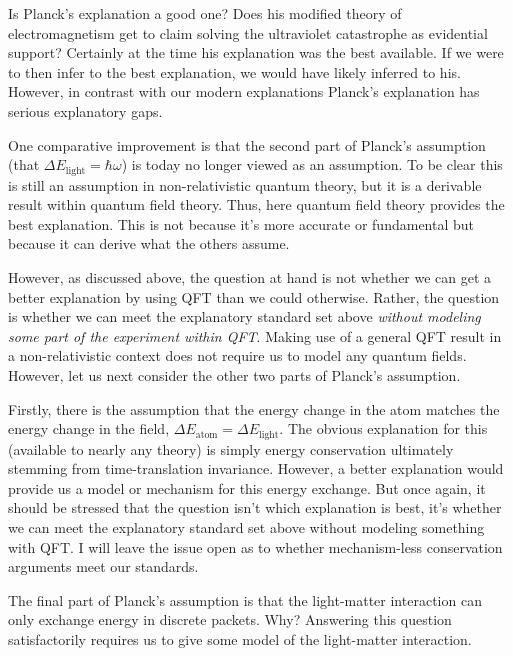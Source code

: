 \documentclass[12pt,prd,superscriptaddress,floatfix,amsmath,amssymb,amsfonts,nofootinbib]{revtex4-2}
\begin{document}
Is Planck's explanation a good one? Does his modified theory of electromagnetism get to claim solving the ultraviolet catastrophe as evidential support? Certainly at the time his explanation was the best available. If we were to then infer to the best explanation, we would have likely inferred to his. However, in contrast with our modern explanations Planck's explanation has serious explanatory gaps.

One comparative improvement is that the second part of Planck's assumption (that \mbox{$\Delta E_\text{light}=\hbar\omega$}) is today no longer viewed as an assumption. To be clear this is still an assumption in non-relativistic quantum theory, but it is a derivable result within quantum field theory. Thus, here quantum field theory provides the best explanation. This is not because it's more accurate or fundamental but because it can derive what the others assume. 

However, as discussed above, the question at hand is not whether we can get a better explanation by using QFT than we could otherwise. Rather, the question is whether we can meet the explanatory standard set above \textit{without modeling some part of the experiment within QFT}. Making use of a general QFT result in a non-relativistic context does not require us to model any quantum fields. However, let us next consider the other two parts of Planck's assumption.

Firstly, there is the assumption that the energy change in the atom matches the energy change in the field, $\Delta E_\text{atom}=\Delta E_\text{light}$. The obvious explanation for this (available to nearly any theory) is simply energy conservation ultimately stemming from time-translation invariance. However, a better explanation would provide us a model or mechanism for this energy exchange. But once again, it should be stressed that the question isn't which explanation is best, it's whether we can meet the explanatory standard set above without modeling something with QFT. I will leave the issue open as to whether mechanism-less conservation arguments meet our standards.

The final part of Planck's assumption is that the light-matter interaction can only exchange energy in discrete packets. Why? Answering this question satisfactorily requires us to give some model of the light-matter interaction.
\end{document}
